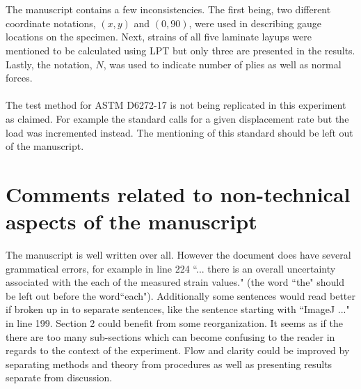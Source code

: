 \documentclass[12pt]{article}
\begin{document}
\\
\\
The manuscript contains a few inconsistencies. The first being, two different coordinate notations, $(x,y)$ and $(0,90)$, were used in describing  gauge locations on the specimen. Next, strains of all five laminate layups were mentioned to be calculated using LPT but only three are presented in the results. Lastly, the notation, $N$, was used to indicate number of plies as well as normal forces.
\\
\\
The test method for ASTM D6272-17 is not being replicated in this experiment as claimed. For example the standard calls for a given displacement rate but the load was incremented instead. The mentioning of this standard should be left out of the manuscript.  
\section*{Comments related to non-technical aspects of the manuscript} 

The manuscript is well written over all. However the document does have several grammatical errors, for example in line 224 ``... there is an overall uncertainty associated with the each of the measured strain values." (the word ``the" should be left out before the word``each"). Additionally some sentences would read better if broken up in to separate sentences, like the sentence starting with ``ImageJ ..." in line 199. 
Section 2 could benefit from some reorganization. It seems as if the there are too many sub-sections which can become confusing to the reader in regards to the context of the experiment.  Flow and clarity could be improved by separating methods and theory from procedures as well as presenting results separate from discussion. 
\end{document}
